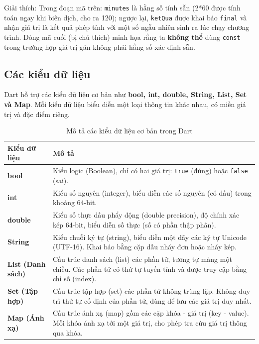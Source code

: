 \documentclass[../DoAn.tex]{subfiles}
\numberwithin{figure}{chapter}
\begin{document}
Giải thích: 
Trong đoạn mã trên: \texttt{minutes} là hằng số tính sẵn (2*60 được tính toán ngay khi biên dịch, cho ra 120); ngược lại, \texttt{ketQua} được khai báo \texttt{final} và nhận giá trị là kết quả phép tính với một số ngẫu nhiên sinh ra lúc chạy chương trình. Dòng mã cuối (bị chú thích) minh họa rằng ta \textbf{không thể} dùng \texttt{const} trong trường hợp giá trị gán không phải hằng số xác định sẵn. \\[0.5em]
\subsection{Các kiểu dữ liệu} 
Dart hỗ trợ các kiểu dữ liệu cơ bản như \textbf{bool, int, double, String, List, Set và Map}. Mỗi kiểu dữ liệu biểu diễn một loại thông tin khác nhau, có miền giá trị và đặc điểm riêng.

\begin{table}[h]
\centering
\begin{tabular}{|p{}|p{}|}
\hline
\textbf{Kiểu dữ liệu} & \textbf{Mô tả} \\ \hline
\textbf{bool} & Kiểu logic (Boolean), chỉ có hai giá trị: \texttt{true} (đúng) hoặc \texttt{false} (sai). \\ \hline
\textbf{int} & Kiểu số nguyên (integer), biểu diễn các số nguyên (có dấu) trong khoảng 64-bit. \\ \hline
\textbf{double} & Kiểu số thực dấu phẩy động (double precision), độ chính xác kép 64-bit, biểu diễn số thực (số có phần thập phân). \\ \hline
\textbf{String} & Kiểu chuỗi ký tự (string), biểu diễn một dãy các ký tự Unicode (UTF-16). Khai báo bằng cặp dấu nháy đơn hoặc nháy kép. \\ \hline
\textbf{List (Danh sách)} & Cấu trúc danh sách (list) các phần tử, tương tự mảng một chiều. Các phần tử có thứ tự tuyến tính và được truy cập bằng chỉ số (index). \\ \hline
\textbf{Set (Tập hợp)} & Cấu trúc tập hợp (set) các phần tử không trùng lặp. Không duy trì thứ tự cố định của phần tử, dùng để lưu các giá trị duy nhất. \\ \hline
\textbf{Map (Ánh xạ)} & Cấu trúc ánh xạ (map) gồm các cặp khóa - giá trị (key - value). Mỗi khóa ánh xạ tới một giá trị, cho phép tra cứu giá trị thông qua khóa. \\ \hline
\end{tabular}
\caption{Mô tả các kiểu dữ liệu cơ bản trong Dart}
\end{table}
\end{document}
